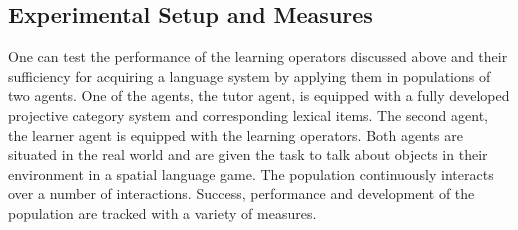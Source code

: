 \subsection{Experimental Setup and Measures}
One can test the performance of the learning operators discussed above and their 
sufficiency for acquiring a language system by applying them in populations
of two agents. One of the agents, the tutor agent, is equipped with a fully 
developed projective category system and corresponding lexical items. 
The second agent, the learner agent is equipped with the learning operators.
Both agents are situated in the real world and are given the task to talk about
objects in their environment in a spatial language game. The population
continuously interacts over a number of interactions. Success, performance
and development of the population are tracked with a variety of measures.
